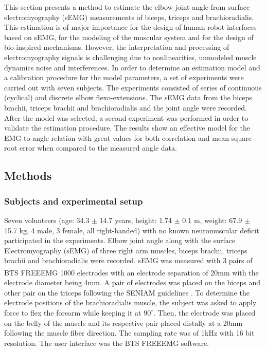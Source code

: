 This section presents a method to estimate the elbow joint angle from surface electromyography (sEMG) measurements of biceps, triceps and brachioradialis. This estimation is of major importance for the design of human robot interfaces based on sEMG, for the modeling of the muscular system and for the design of bio-inspired mechanisms. However, the interpretation and processing of electromyography signals is challenging due to nonlinearities, unmodeled muscle dynamics noise and interferences. In order to determine an estimation model and a calibration procedure for the model parameters, a set of experiments were carried out with seven subjects. The experiments consisted of series of continuous (cyclical) and discrete elbow flexo-extensions. The sEMG data from the biceps brachii, triceps brachii and brachioradialis and the joint angle were recorded. After the model was selected, a second experiment was performed in order to validate the estimation procedure. The results show an effective model for the EMG-to-angle relation with great values for both correlation and mean-square-root error when compared to the measured angle data.

\subsection{Methods}
\subsubsection{Subjects and experimental setup}
Seven volunteers (age: 34.3 $\pm$ 14.7 years, height: 1.74 $\pm$ 0.1 m, weight: 67.9 $\pm$ 15.7 kg, 4 male, 3 female, all right-handed) with no known neuromuscular deficit participated in the experiments. Elbow joint angle along with the surface Electromyography (sEMG) of three right arm muscles, biceps brachii, triceps brachii and brachioradialis were recorded. 
sEMG was measured with 3 pairs of BTS FREEEMG 1000 \textsuperscript{\textregistered} electrodes with an electrode separation of 20mm with the electrode diameter being 4mm. A pair of electrodes was placed on the biceps and other pair on the triceps following the SENIAM guidelines \cite{SENIAM20170110}. To determine the electrode positions of the brachioradialis muscle, the subject was asked to apply force to flex the forearm while keeping it at \(90^{\circ}\). Then, the electrode was placed on the belly of the muscle and its respective pair placed distally at a 20mm following the muscle fiber direction. The sampling rate was of 1kHz with 16 bit resolution. The user interface was the BTS FREEEMG software. 

